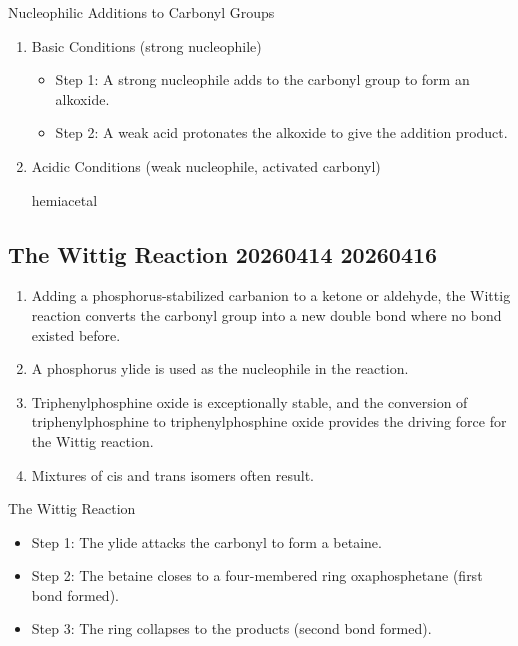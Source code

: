 \begin{mechanism}
    Nucleophilic Additions to Carbonyl Groups
    \begin{enumerate}
        \item Basic Conditions (strong nucleophile)
        \begin{itemize}
            \item Step 1: A strong nucleophile adds to the carbonyl group to form an alkoxide.
            \item Step 2: A weak acid protonates the alkoxide to give the addition product.
        \end{itemize}
        \item Acidic Conditions (weak nucleophile, activated carbonyl)
        
        hemiacetal %
    \end{enumerate}
\end{mechanism}

\subsection{The Wittig Reaction 20260414 20260416}

\begin{enumerate}
    \item Adding a phosphorus-stabilized carbanion to a ketone or aldehyde, the Wittig reaction converts the carbonyl group into a new  double bond where no bond existed before.
    \item A phosphorus ylide is used as the nucleophile in the reaction. %
    \item Triphenylphosphine oxide is exceptionally stable, and the conversion of triphenylphosphine to triphenylphosphine oxide provides the driving force for the Wittig reaction.
    \item Mixtures of cis and trans isomers often result.
\end{enumerate}

\begin{mechanism}
    The Wittig Reaction
    \begin{itemize}
        \item Step 1: The ylide attacks the carbonyl to form a betaine.
        \item Step 2: The betaine closes to a four-membered ring oxaphosphetane (first  bond formed). %
        \item Step 3: The ring collapses to the products (second  bond formed).
    \end{itemize}
\end{mechanism}

